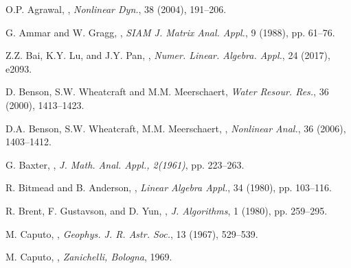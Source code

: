 \documentclass{ecnumaster}
\begin{document}
\backmatter
\linespread{1.1}\selectfont
\begin{thebibliography}{99}
\thispagestyle{plain}

\newblock O.P. Agrawal,
,
\newblock \emph{Nonlinear Dyn.}, 38 (2004), 191--206.

\newblock G. Ammar and W. Gragg,
,
\newblock \emph{SIAM J. Matrix Anal.
Appl.}, 9 (1988), pp. 61--76.

\newblock Z.Z. Bai, K.Y. Lu, and J.Y. Pan,
,
\newblock \emph{Numer. Linear. Algebra. Appl.}, 24 (2017), e2093.

\newblock D. Benson, S.W. Wheatcraft and M.M. Meerschaert,
\newblock \emph{Water Resour. Res.}, 36 (2000), 1413--1423.

\newblock D.A. Benson, S.W. Wheatcraft, M.M. Meerschaert,
,
\newblock \emph{Nonlinear Anal.}, 36 (2006), 1403--1412.

\newblock G. Baxter,
,
\newblock \emph{J. Math. Anal. Appl., 2(1961)}, pp. 223--263.

\newblock R. Bitmead and B. Anderson,
,
\newblock \emph{Linear Algebra Appl.}, 34 (1980), pp. 103--116.

\newblock R. Brent, F. Gustavson, and D. Yun,
,
\newblock \emph{J. Algorithms}, 1 (1980), pp. 259--295.

\newblock M. Caputo,
,
\newblock \emph{Geophys. J. R. Astr. Soc.}, 13 (1967), 529--539.

\newblock M. Caputo,
,
\newblock \emph{Zanichelli, Bologna}, 1969.


\end{thebibliography}
\end{document}
